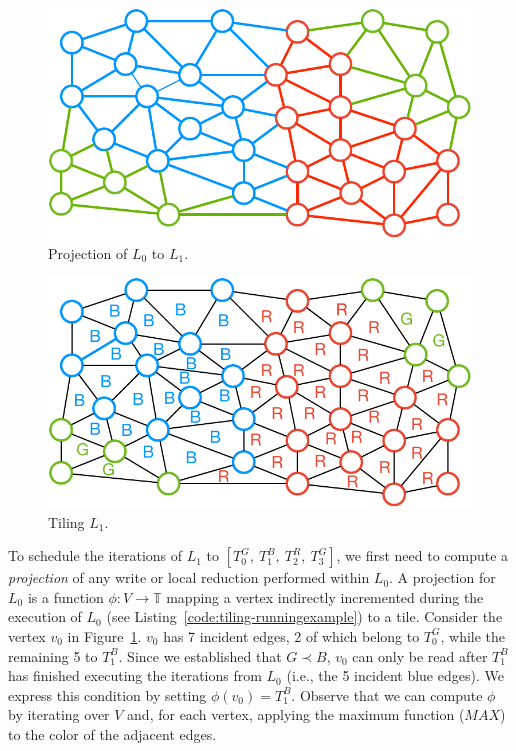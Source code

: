 \begin{figure}[h]
\centering
\includegraphics[scale=0.7]{sparsetiling/figures/loop_0_with_vertices.pdf}
\caption{Projection of $L_0$ to $L_1$.}
\label{fig:st-loop-0-proj}
\end{figure}

\begin{figure}[h]
\centering
\includegraphics[scale=0.7]{sparsetiling/figures/loop_1.pdf}
\caption{Tiling $L_1$.}
\label{fig:st-loop-1}
\end{figure}

To schedule the iterations of $L_1$ to $[T_0^G,\ T_1^B,\ T_2^R,\ T_3^G]$, we first need to compute a \textit{projection} of any write or local reduction performed within $L_0$.  A projection for $L_0$ is a function $\phi : V \rightarrow \mathbb{T}$ mapping a vertex indirectly incremented during the execution of $L_0$ (see Listing~\ref{code:tiling-runningexample}) to a tile. Consider the vertex $v_0$ in Figure~\ref{fig:st-loop-0-proj}. $v_0$ has 7 incident edges, 2 of which belong to $T_0^G$, while the remaining 5 to $T_1^B$. Since we established that $G \prec B$, $v_0$ can only be read after $T_1^B$ has finished executing the iterations from $L_0$ (i.e., the 5 incident blue edges). We express this condition by setting $\phi(v_0) = T_1^B$. Observe that we can compute $\phi$ by iterating over $V$ and, for each vertex, applying the maximum function ($MAX$) to the color of the adjacent edges. 

